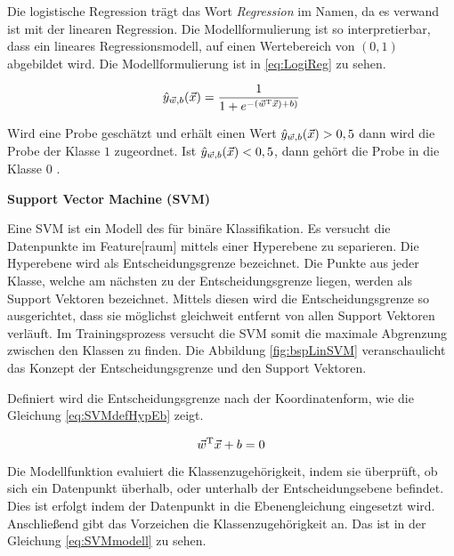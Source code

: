 Die logistische Regression trägt das Wort \textit{Regression} im Namen, da es verwand ist mit der linearen Regression. Die Modellformulierung ist so interpretierbar, dass ein lineares Regressionsmodell, auf einen Wertebereich von \((0,1)\) abgebildet wird. Die Modellformulierung ist in \ref{eq:LogiReg} zu sehen.

\begin{equation}
\hat{y}_{\vec{w},b}(\vec{x}) = \frac{1}{1 + e^{-(\vec{w}^\mathrm{T}\vec{x})+b)}}
\label{eq:LogiReg}
\end{equation}

Wird eine Probe geschätzt und erhält einen Wert \(\hat{y}_{\vec{w},b}(\vec{x}) > 0,5\) dann wird die Probe der Klasse \(1\) zugeordnet. Ist \(\hat{y}_{\vec{w},b}(\vec{x}) < 0,5\), dann gehört die Probe in die Klasse \(0\) \cite{Burkov.2019, Goodfellow.2016}.

\dubpar
\textbf{Support Vector Machine (\acrshort{SVM})} \par
Eine \acrshort{SVM} ist ein Modell des  für binäre \gls{Klassifikation}. Es versucht die Datenpunkte im \gls{Feature}[raum] mittels einer Hyperebene zu separieren. Die Hyperebene wird als Entscheidungsgrenze bezeichnet. Die Punkte aus jeder Klasse, welche am nächsten zu der Entscheidungsgrenze liegen, werden als Support Vektoren bezeichnet. Mittels diesen wird die Entscheidungsgrenze so ausgerichtet, dass sie möglichst gleichweit entfernt von allen Support Vektoren verläuft. Im Trainingsprozess versucht die \acrshort{SVM} somit die maximale Abgrenzung zwischen den Klassen zu finden. Die Abbildung \ref{fig:bspLinSVM} veranschaulicht das Konzept der Entscheidungsgrenze und den Support Vektoren. 


Definiert wird die Entscheidungsgrenze nach der Koordinatenform, wie die Gleichung \ref{eq:SVMdefHypEb} zeigt.

\begin{equation}
\vec{w}^\mathrm{T}\vec{x}+b=0
\label{eq:SVMdefHypEb}
\end{equation}

Die Modellfunktion evaluiert die Klassenzugehörigkeit, indem sie überprüft, ob sich ein Datenpunkt überhalb, oder unterhalb der Entscheidungsebene befindet. Dies ist erfolgt indem der Datenpunkt in die Ebenengleichung eingesetzt wird. Anschließend gibt das Vorzeichen die Klassenzugehörigkeit an. Das ist in der Gleichung \ref{eq:SVMmodell} zu sehen. 

